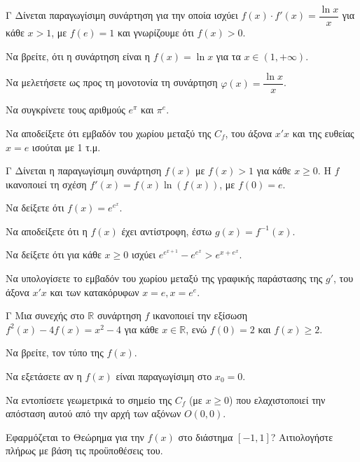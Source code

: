\begin{thema}{Γ}
Δίνεται παραγωγίσιμη συνάρτηση για την οποία ισχύει $f(x) \cdot f'(x) = \dfrac{\ln x}{x}$ για κάθε $x>1$, με $f(e) = 1$ και γνωρίζουμε ότι $f(x) > 0$. 
\begin{erwthma}
  \item Να βρείτε, ότι η συνάρτηση είναι η $f(x) = \ln x$ για τα $x \in (1, +\infty)$.
  \item Να μελετήσετε ως προς τη μονοτονία τη συνάρτηση $\varphi(x) = \dfrac{\ln x}{x}$.
  \item Να συγκρίνετε τους αριθμούς $e^\pi$ και $\pi^e$. 
  \item Να αποδείξετε ότι εμβαδόν του χωρίου μεταξύ της $C_f$, του άξονα $x'x$ και της ευθείας $x=e$ ισούται με 1 τ.μ.
\end{erwthma}
\end{thema}

\begin{thema}{Γ}
Δίνεται η παραγωγίσιμη συνάρτηση $f(x)$ με $f(x) > 1$ για κάθε $x \ge 0$. Η $f$ ικανοποιεί τη σχέση $f'(x) = f(x) \ln(f(x))$, με $f(0) = e$.
\begin{erwthma}
  \item Να δείξετε ότι $f(x) = e^{e^x}$.
  \item Να αποδείξετε ότι η $f(x)$ έχει αντίστροφη, έστω $g(x)=f^{-1}(x)$.
  \item Να δείξετε ότι για κάθε $x \ge 0$ ισχύει $e^{e^{x+1}} - e^{e^x} > e^{x+e^x}$.
  \item Να υπολογίσετε το εμβαδόν του χωρίου μεταξύ της γραφικής παράστασης της $g'$, του άξονα $x'x$ και των κατακόρυφων $x=e, x=e^e$.
\end{erwthma}
\end{thema}

\begin{thema}{Γ}
Μια συνεχής στο $\mathbb{R}$ συνάρτηση $f$ ικανοποιεί την εξίσωση $f^2(x) - 4f(x) = x^2 - 4$ για κάθε $x\in\mathbb{R}$, ενώ $f(0)=2$ και $f(x) \ge 2$.
\begin{erwthma}
  \item Να βρείτε, τον τύπο της $f(x)$.
  \item Να εξετάσετε αν η $f(x)$ είναι παραγωγίσιμη στο $x_0=0$.
  \item Να εντοπίσετε γεωμετρικά το σημείο της $C_f$ (με $x \ge 0$) που ελαχιστοποιεί την απόσταση αυτού από την αρχή των αξόνων $O(0,0)$.
  \item Εφαρμόζεται το Θεώρημα  για την $f(x)$ στο διάστημα $[-1, 1]$? Αιτιολογήστε πλήρως με βάση τις προϋποθέσεις του. 
\end{erwthma}
\end{thema}

